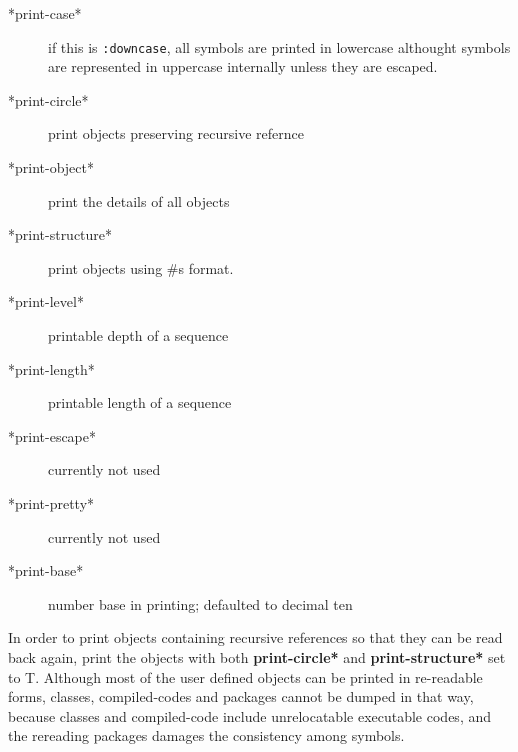 \begin{description}

\item[*print-case*] if this is {\tt :downcase},
all symbols are printed in lowercase
althought symbols are represented in uppercase
internally unless they are escaped.
\item[*print-circle*] print objects preserving recursive refernce
\item[*print-object*] print the details of all objects
\item[*print-structure*] print objects using \#s format.
\item[*print-level*] printable depth of a sequence
\item[*print-length*] printable length of a sequence
\item[*print-escape*] currently not used
\item[*print-pretty*] currently not used
\item[*print-base*] number base in printing; defaulted to decimal ten
\end{description}

In order to print objects containing recursive references 
so that they can be read back again,
print the objects with both {\bf *print-circle*} and
{\bf *print-structure*} set to T.
Although most of the user defined objects can be printed in re-readable forms,
classes, compiled-codes and packages cannot be dumped in that way,
because classes and compiled-code include unrelocatable
executable codes, and the rereading packages 
damages the consistency among symbols.

